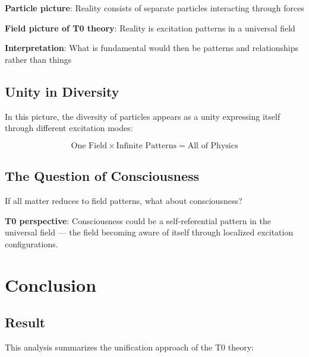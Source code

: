 	\begin{tcolorbox}[colback=purple!5!white,colframe=purple!75!black,title=Viewpoint: From Particles to Patterns]
		\textbf{Particle picture}: Reality consists of separate particles interacting through forces
		
		\textbf{Field picture of T0 theory}: Reality is excitation patterns in a universal field
		
		\textbf{Interpretation}: What is fundamental would then be patterns and relationships rather than things
	\end{tcolorbox}
	
	\subsection{Unity in Diversity}
	
	In this picture, the diversity of particles appears as a unity expressing itself through different excitation modes:
	
	\begin{equation}
		\boxed{\text{One Field} \times \text{Infinite Patterns} = \text{All of Physics}}
		\label{eq:ultimate_unity}
	\end{equation}
	
	\subsection{The Question of Consciousness}
	
	If all matter reduces to field patterns, what about consciousness?
	
	\textbf{T0 perspective}: Consciousness could be a self-referential pattern in the universal field --- the field becoming aware of itself through localized excitation configurations.
	
	\section{Conclusion}
	
	\subsection{Result}
	
	This analysis summarizes the unification approach of the T0 theory:
	
